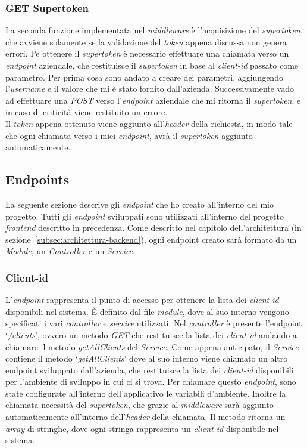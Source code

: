 \subsubsection{GET Supertoken}
La seconda funzione implementata nel \textit{middleware} è l'acquisizione del \textit{supertoken}, che avviene solamente se la validazione del \textit{token} appena discussa non genera errori.
Pe ottenere il \textit{supertoken} è necessario effettuare una chiamata verso un \textit{endpoint} aziendale, che restituisce il \textit{supertoken} in base al \textit{client-id} passato come parametro.
Per prima cosa sono andato a creare dei parametri, aggiungendo l'\textit{username} e il valore che mi è stato fornito dall'azienda.
Successivamente vado ad effettuare una \textit{POST} verso l'\textit{endpoint} aziendale che mi ritorna il \textit{supertoken}, e in caso di criticità viene restituito un errore.\\
Il \textit{token} appena ottenuto viene aggiunto all'\textit{header} della richiesta, in modo tale che ogni chiamata verso i miei \textit{endpoint}, avrà il \textit{supertoken} aggiunto automaticamente.


\subsection{Endpoints}\label{subsec:endpoints}
La seguente sezione descrive gli \textit{endpoint} che ho creato all'interno del mio progetto. Tutti gli \textit{endpoint} sviluppati 
sono utilizzati all'interno del progetto \textit{frontend} descritto in precedenza.
Come descritto nel capitolo dell'architettura (in sezione~\ref{subsec:architettura-backend}), ogni endpoint creato sarà formato da un \textit{Module}, un \textit{Controller} e un \textit{Service}.

\subsubsection{Client-id}
L'\textit{endpoint} rappresenta il punto di accesso per ottenere la lista dei \textit{client-id} disponibili nel sistema.
È definito dal file \textit{module}, dove al suo interno vengono specificati i vari \textit{controller} e \textit{service} utilizzati.
Nel \textit{controller} è presente l'endpoint `\textit{/clients}', ovvero un metodo \textit{GET} che restituisce la lista dei \textit{client-id} andando
a chiamare il metodo \textit{getAllClients} del \textit{Service}.
Come appena anticipato, il \textit{Service} contiene il metodo `\textit{getAllClients}' dove al suo interno viene chiamato un altro endpoint sviluppato dall'azienda, che restituisce 
la lista dei \textit{client-id} disponibili per l'ambiente di sviluppo in cui ci si trova.
Per chiamare questo \textit{endpoint}, sono state configurate all'interno dell'applicativo le variabili d'ambiente.
Inoltre la chiamata necessità del \textit{supertoken}, che grazie al \textit{middleware} sarà aggiunto automaticamente all'interno 
dell'\textit{header} della chiamata.
Il metodo ritorna un \textit{array} di stringhe, dove ogni stringa rappresenta un \textit{client-id} disponibile nel sistema.

